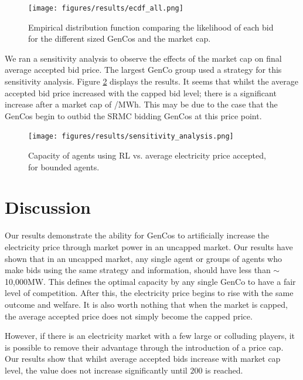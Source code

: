 \documentclass[conference]{IEEEtran}
\begin{document}
\begin{figure}
	\centering
    \texttt{[image: figures/results/ecdf\_all.png]}
    \caption{Empirical distribution function comparing the likelihood of each bid for the different sized GenCos and the market cap.}
    \label{fig:ecdf_all}
\end{figure}

We ran a sensitivity analysis to observe the effects of the market cap on final average accepted bid price. The largest GenCo group used a strategy for this sensitivity analysis. Figure \ref{fig:sensitivity_analysis} displays the results. It seems that whilst the average accepted bid price increased with the capped bid level; there is a significant increase after a market cap of /MWh. This may be due to the case that the GenCos begin to outbid the SRMC bidding GenCos at this price point.
\begin{figure}
    \texttt{[image: figures/results/sensitivity\_analysis.png]}
    \caption{Capacity of agents using RL vs. average electricity price accepted, for bounded agents.}
    \label{fig:sensitivity_analysis}
\end{figure}






\section{Discussion}
\label{sec:discussion}

Our results demonstrate the ability for GenCos to artificially increase the electricity price through market power in an uncapped market. Our results have shown that in an uncapped market, any single agent or groups of agents who make bids using the same strategy and information, should have less than ${\sim}$10,000MW. This defines the optimal capacity by any single GenCo to have a fair level of competition. After this, the electricity price begins to rise with the same outcome and welfare. It is also worth nothing that when the market is capped, the average accepted price does not simply become the capped price.

However, if there is an electricity market with a few large or colluding players, it is possible to remove their advantage through the introduction of a price cap. Our results show that whilst average accepted bids increase with market cap level, the value does not increase significantly until \textsterling$200$ is reached.
\end{document}
